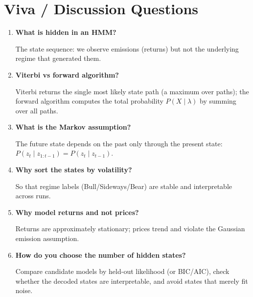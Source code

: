 \section{Viva / Discussion Questions}
\begin{enumerate}
  \item \textbf{What is hidden in an HMM?}\par\nobreak The state sequence: we observe emissions (returns) but not
  the underlying regime that generated them.
  \item \textbf{Viterbi vs forward algorithm?}\par\nobreak Viterbi returns the single most likely state path (a
  maximum over paths); the forward algorithm computes the total probability $P(X \mid \lambda)$
  by summing over all paths.
  \item \textbf{What is the Markov assumption?}\par\nobreak The future state depends on the past only through the
  present state: $P(z_t \mid z_{1:t-1}) = P(z_t \mid z_{t-1})$.
  \item \textbf{Why sort the states by volatility?}\par\nobreak So that regime labels (Bull/Sideways/Bear) are
  stable and interpretable across runs.
  \item \textbf{Why model returns and not prices?}\par\nobreak Returns are approximately stationary; prices trend
  and violate the Gaussian emission assumption.
\item \textbf{How do you choose the number of hidden states?}\par\nobreak Compare candidate models by held-out likelihood (or BIC/AIC), check whether the decoded states are interpretable, and avoid states that merely fit noise.
\end{enumerate}

